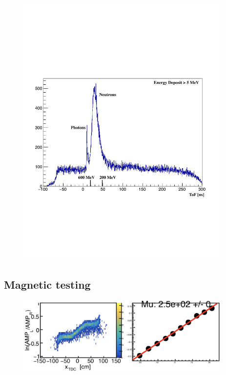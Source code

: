 \documentclass[review]{elsarticle}
\begin{document}
\begin{figure}[h!]
\centering
\includegraphics[width=0.96\textwidth]{tof-labels.pdf}
\caption{}
\end{figure}


\subsection{Magnetic testing}

\begin{figure}[h!]
\centering
\includegraphics[width=0.96\textwidth]{atten.png}
\caption{}
\end{figure}
\end{document}
